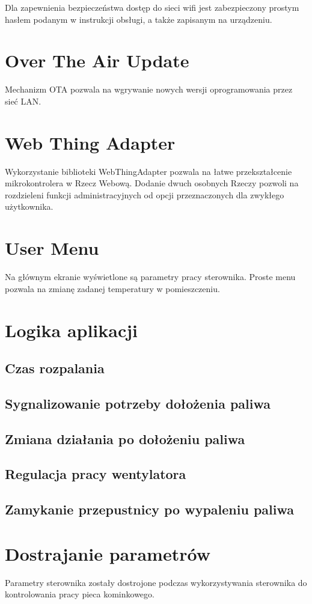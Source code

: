 \documentclass[12pt]{report}
\begin{document}
 Dla zapewnienia bezpieczeństwa dostęp do sieci wifi jest zabezpieczony prostym hasłem podanym w instrukcji obsługi, a także zapisanym na urządzeniu.
 
 \section{Over The Air Update}
 Mechanizm OTA pozwala na wgrywanie nowych wersji oprogramowania przez sieć LAN.
 
 \section{Web Thing Adapter}
 Wykorzystanie biblioteki WebThingAdapter pozwala na łatwe przekształcenie mikrokontrolera w Rzecz Webową.
 Dodanie dwuch osobnych Rzeczy pozwoli na rozdzieleni funkcji administracyjnych od opcji przeznaczonych dla zwykłego użytkownika.
 
 \section{User Menu}
 Na głównym ekranie wyświetlone są parametry pracy sterownika.
 Proste menu pozwala na zmianę zadanej temperatury w pomieszczeniu.
 
 \section{Logika aplikacji}
 \subsection{Czas rozpalania}
 \subsection{Sygnalizowanie potrzeby dołożenia paliwa}
 \subsection{Zmiana działania po dołożeniu paliwa}
 \subsection{Regulacja pracy wentylatora}
 \subsection{Zamykanie przepustnicy po wypaleniu paliwa}
 
 \section{Dostrajanie parametrów}
 Parametry sterownika zostały dostrojone podczas wykorzystywania sterownika do kontrolowania pracy pieca kominkowego.
 
\end{document}
